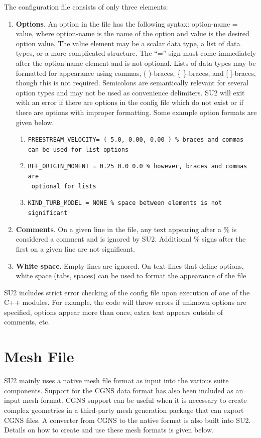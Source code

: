 \documentclass{article}
\begin{document}
The configuration file consists of only three elements:
\begin{enumerate}
    \item \textbf{Options}. An option in the file has the following syntax: option-name = value, where option-name is the name of the option and value is the desired option value. The value element may be a scalar data type, a list of data types, or a more complicated structure. The “=” sign must come immediately after the option-name element and is not optional. Lists of data types may be formatted for appearance using commas, ( )-braces, \{ \}-braces, and [ ]-braces, though this is not required. Semicolons are semantically relevant for several option types and may not be used as convenience delimiters. SU2 will exit with an error if there are options in the config file which do not exist or if there are options with improper formatting. Some example option formats are given below. 
    \begin{enumerate}
        \item \verb|FREESTREAM_VELOCITY= ( 5.0, 0.00, 0.00 ) % braces and commas  | \\ \verb|can be used for list options|
        \item \verb|REF_ORIGIN_MOMENT = 0.25 0.0 0.0 % however, braces and commas are| \\ \verb| optional for lists|
        \item \verb|KIND_TURB_MODEL = NONE % space between elements is not significant|

    \end{enumerate}
    \item \textbf{Comments}. On a given line in the file, any text appearing after a \% is considered a comment and is ignored by SU2. Additional \% signs after the first on a given line are not significant.
    \item \textbf{White space}. Empty lines are ignored. On text lines that define options, white space (tabs, spaces) can be used to format the appearance of the file
\end{enumerate}

SU2 includes strict error checking of the config file upon execution of one of the C++ modules. For example, the code will throw errors if unknown options are specified, options appear more than once, extra text appears outside of comments, etc.


\newpage
\section{Mesh File}
SU2 mainly uses a native mesh file format as input into the various suite components. Support for the CGNS data format has also been included as an input mesh format. CGNS support can be useful when it is necessary to create complex geometries in a third-party mesh generation package that can export CGNS files. A converter from CGNS to the native format is also built into SU2. Details on how to create and use these mesh formats is given below.
\end{document}
